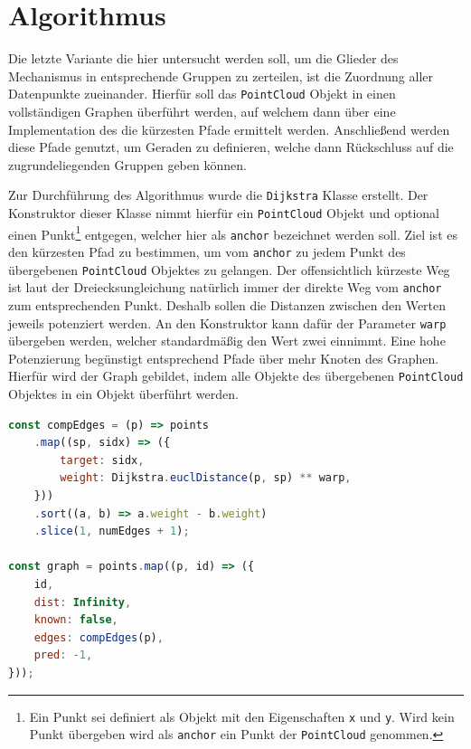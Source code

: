 \section{ Algorithmus}\label{ch:dijkstra}

Die letzte Variante die hier untersucht werden soll, um die Glieder des Mechanismus in entsprechende Gruppen zu zerteilen, ist die Zuordnung aller Datenpunkte zueinander.
Hierfür soll das \lstinline{PointCloud} Objekt in einen vollständigen Graphen überführt werden, auf welchem dann über eine Implementation des  die kürzesten Pfade ermittelt werden.
Anschlie{\ss}end werden diese Pfade genutzt, um Geraden zu definieren, welche dann Rückschluss auf die zugrundeliegenden Gruppen geben können.

Zur Durchführung des  Algorithmus wurde die \lstinline{Dijkstra} Klasse erstellt.
Der Konstruktor dieser Klasse nimmt hierfür ein \lstinline{PointCloud} Objekt und optional einen Punkt\footnote{Ein Punkt sei definiert als Objekt mit den Eigenschaften \lstinline{x} und \lstinline{y}. Wird kein Punkt übergeben wird als \lstinline{anchor} ein Punkt der \lstinline{PointCloud} genommen.} entgegen, welcher hier als \lstinline{anchor} bezeichnet werden soll.
Ziel ist es den kürzesten Pfad zu bestimmen, um vom \lstinline{anchor} zu jedem Punkt des übergebenen \lstinline{PointCloud} Objektes zu gelangen.
Der offensichtlich kürzeste Weg ist laut der Dreiecksungleichung natürlich immer der direkte Weg vom \lstinline{anchor} zum entsprechenden Punkt.
Deshalb sollen die Distanzen zwischen den Werten jeweils potenziert werden.
An den Konstruktor kann dafür der Parameter \lstinline{warp} übergeben werden, welcher standardmä{\ss}ig den Wert zwei einnimmt.
Eine hohe Potenzierung begünstigt entsprechend Pfade über mehr Knoten des Graphen.
Hierfür wird der Graph gebildet, indem alle Objekte des übergebenen \lstinline{PointCloud} Objektes in ein Objekt überführt werden.

\begin{lstlisting}[language=JavaScript, caption={Im \lstinline{Dijkstra} Konstruktor werden die Punkte des übergebenen \lstinline{PointCloud} Objektes in einen Graphen überführt.}, label={lst:dijkstra_points_graph}]
const compEdges = (p) => points
    .map((sp, sidx) => ({
        target: sidx,
        weight: Dijkstra.euclDistance(p, sp) ** warp,
    }))
    .sort((a, b) => a.weight - b.weight)
    .slice(1, numEdges + 1);

const graph = points.map((p, id) => ({
    id,
    dist: Infinity,
    known: false,
    edges: compEdges(p),
    pred: -1,
}));
\end{lstlisting}

